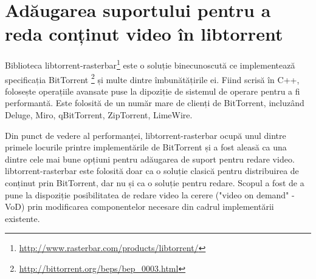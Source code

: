 \section{Adăugarea suportului pentru a reda conținut video în libtorrent}
\label{sec:multimedia-dist:libtorrent}


Biblioteca libtorrent-rasterbar\footnote{\url{http://www.rasterbar.com/products/libtorrent/}}
este o soluție binecunoscută ce implementează specificația BitTorrent
\footnote{\url{http://bittorrent.org/beps/bep\_0003.html}} și multe dintre
îmbunătățirile ei. Fiind scrisă în C++, folosește operațiile avansate puse
la dipoziție de sistemul de operare pentru a fi performantă. Este folosită de
un număr mare de clienți de BitTorrent, incluzând Deluge, Miro, qBitTorrent,
ZipTorrent, LimeWire.

Din punct de vedere al performanței, libtorrent-rasterbar ocupă unul dintre
primele locurile printre implementările de BitTorrent și a fost aleasă ca
una dintre cele mai bune opțiuni pentru adăugarea de suport pentru redare
video. libtorrent-rasterbar este folosită doar ca o soluție clasică pentru
distribuirea de conținut prin BitTorrent, dar nu și ca o soluție pentru
redare. Scopul a fost de a pune la dispoziție posibilitatea de redare video la
cerere ("video on demand" - VoD) prin modificarea componentelor necesare din
cadrul implementării existente.

